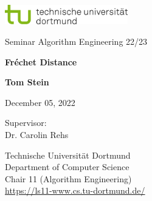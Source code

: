 \begin{titlepage}
    \includegraphics[width=0.4\textwidth]{images/tud_logo_rgb.jpg}

    \begin{center}
        \vspace{3.5cm} \LARGE Seminar Algorithm Engineering 22/23

        \vspace{0.5cm} \huge \textbf{Fréchet Distance}

        \vspace{5cm} \textbf{Tom Stein}

        \vspace{0.25cm} \Large December 05, 2022
    \end{center}

    \vspace{5.2cm} \large \noindent Supervisor: \\
    Dr. Carolin Rehs
    
    \vspace{1cm} \noindent Technische Universität Dortmund \\
    Department of Computer Science \\
    Chair 11 (Algorithm Engineering) \\ 
    \url{https://ls11-www.cs.tu-dortmund.de/}

    
\end{titlepage}
